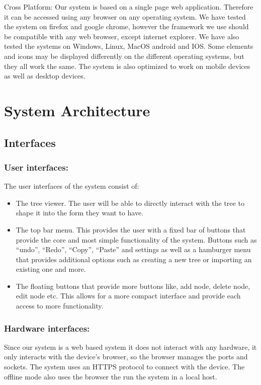 \documentclass{article}
\begin{document}
  Cross Platform:\newline 
  Our system is based on a single page web application. Therefore it can be accessed using any browser on any operating system. We have tested the system on firefox and google chrome, however the framework we use should be compatible with any web browser, except internet explorer. We have also tested the systems on Windows, Linux, MacOS android and IOS. Some elements and icons may be displayed differently on the different operating systems, but they all work the same. The system is also optimized to work on mobile devices as well as desktop devices.\newline\newline  


\section{System Architecture}
  \subsection{Interfaces} 
    \subsubsection{User interfaces:} 
      The user interfaces of the system consist of:
      \begin{itemize}
      \item The tree viewer. The user will be able to directly interact with the tree to shape it into the form they want to have.
      \item The top bar menu. This provides the user with a fixed bar of buttons that provide the core and most simple functionality of the system. Buttons such as “undo”, “Redo”, “Copy”, “Paste” and settings as well as a hamburger menu that provides additional options such as creating a new tree or importing an existing one and more.
      \item The floating buttons that provide more buttons like, add node, delete node, edit node etc. This allows for a more compact interface and provide each access to more functionality.
      \end{itemize}

    \subsubsection{Hardware interfaces:}
      Since our system is a web based system it does not interact with any hardware, it only interacts with the device’s browser, so the browser manages the ports and sockets. The system uses an HTTPS protocol to connect with the device. The offline mode also uses the browser the run the system in a local host.
\end{document}

